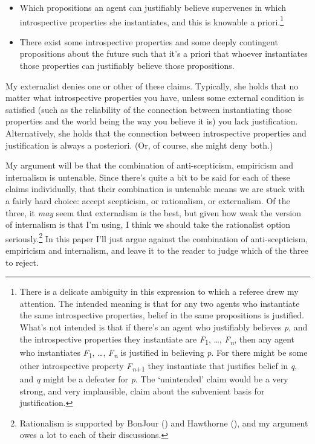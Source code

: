 \documentclass[
  11pt,
  letterpaper,
  DIV=11,
  numbers=noendperiod,
  twoside]{scrartcl}
\providecommand{\tightlist}{%
  \setlength{\itemsep}{0pt}\setlength{\parskip}{0pt}}
\begin{document}
\begin{itemize}
\tightlist
\item
  Which propositions an agent can justifiably believe supervenes in
  which introspective properties she instantiates, and this is knowable
  a priori.\footnote{There is a delicate ambiguity in this expression to
    which a referee drew my attention. The intended meaning is that for
    any two agents who instantiate the same introspective properties,
    belief in the same propositions is justified. What's not intended is
    that if there's an agent who justifiably believes \emph{p}, and the
    introspective properties they instantiate are
    \emph{F}\textsubscript{1}, \ldots, \emph{F\textsubscript{n}}, then
    any agent who instantiates \emph{F}\textsubscript{1}, \ldots,
    \emph{F\textsubscript{n}} is justified in believing \emph{p}. For
    there might be some other introspective property
    \emph{F\textsubscript{n}}\textsubscript{+1} they instantiate that
    justifies belief in \emph{q}, and \emph{q} might be a defeater for
    \emph{p}. The `unintended' claim would be a very strong, and very
    implausible, claim about the subvenient basis for justification.}
\item
  There exist some introspective properties and some deeply contingent
  propositions about the future such that it's a priori that whoever
  instantiates those properties can justifiably believe those
  propositions.
\end{itemize}

My externalist denies one or other of these claims. Typically, she holds
that no matter what introspective properties you have, unless some
external condition is satisfied (such as the reliability of the
connection between instantiating those properties and the world being
the way you believe it is) you lack justification. Alternatively, she
holds that the connection between introspective properties and
justification is always a posteriori. (Or, of course, she might deny
both.)

My argument will be that the combination of anti-scepticism, empiricism
and internalism is untenable. Since there's quite a bit to be said for
each of these claims individually, that their combination is untenable
means we are stuck with a fairly hard choice: accept scepticism, or
rationalism, or externalism. Of the three, it \emph{may} seem that
externalism is the best, but given how weak the version of internalism
is that I'm using, I think we should take the rationalist option
seriously.\footnote{Rationalism is supported by BonJour
  () and Hawthorne
  (), and my argument owes a lot to
  each of their discussions.} In this paper I'll just argue against the
combination of anti-scepticism, empiricism and internalism, and leave it
to the reader to judge which of the three to reject.
\end{document}
